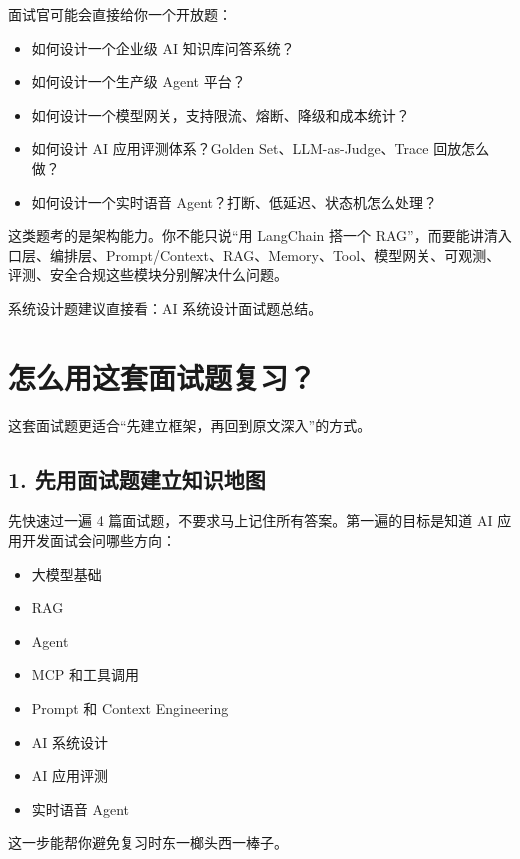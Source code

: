 \documentclass[10pt,a4paper]{ctexart}
\begin{document}
面试官可能会直接给你一个开放题：


\begin{itemize}[itemsep=2pt, topsep=4pt]
  \item 如何设计一个企业级 AI 知识库问答系统？
  \item 如何设计一个生产级 Agent 平台？
  \item 如何设计一个模型网关，支持限流、熔断、降级和成本统计？
  \item 如何设计 AI 应用评测体系？Golden Set、LLM-as-Judge、Trace 回放怎么做？
  \item 如何设计一个实时语音 Agent？打断、低延迟、状态机怎么处理？
\end{itemize}


这类题考的是架构能力。你不能只说“用 LangChain 搭一个 RAG”，而要能讲清入口层、编排层、Prompt/Context、RAG、Memory、Tool、模型网关、可观测、评测、安全合规这些模块分别解决什么问题。



系统设计题建议直接看：AI 系统设计面试题总结。



\section{怎么用这套面试题复习？}


这套面试题更适合“先建立框架，再回到原文深入”的方式。



\subsection{1. 先用面试题建立知识地图}


先快速过一遍 4 篇面试题，不要求马上记住所有答案。第一遍的目标是知道 AI 应用开发面试会问哪些方向：


\begin{itemize}[itemsep=2pt, topsep=4pt]
  \item 大模型基础
  \item RAG
  \item Agent
  \item MCP 和工具调用
  \item Prompt 和 Context Engineering
  \item AI 系统设计
  \item AI 应用评测
  \item 实时语音 Agent
\end{itemize}


这一步能帮你避免复习时东一榔头西一棒子。
\end{document}
